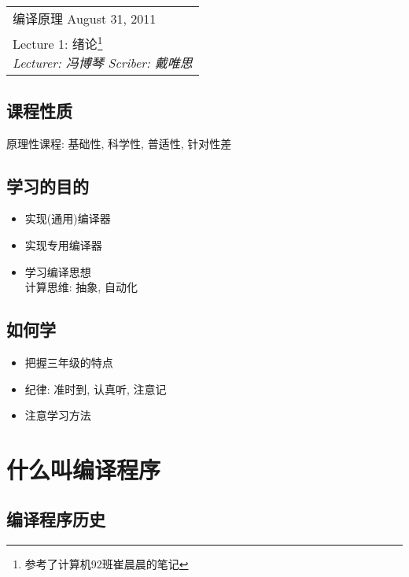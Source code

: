 \clearpage \noindent\begin{tabularx}{\linewidth}{|X|}
\hline \vskip -2mm
{\sf 编译原理} \hfill August 31, 2011 \\
{\centering \sf \large Lecture 1:
绪论\footnote{参考了计算机92班崔晨晨的笔记} \\ }
\textsl{Lecturer: 冯博琴 \hfill Scriber: 戴唯思}\\ \hline
\end{tabularx}
\setcounter{section}{0}
\renewcommand{\thepage}{\lecture -\arabic{page}}
\def\lecture{1}

\subsection{课程性质}

    原理性课程: 基础性, 科学性, 普适性, 针对性差

\subsection{学习的目的}

    \begin{itemize}
        \item 实现(通用)编译器
        \item 实现专用编译器
        \item 学习编译思想 \\
            计算思维: 抽象, 自动化
    \end{itemize}

\subsection{如何学}

    \begin{itemize}
        \item 把握三年级的特点
        \item 纪律: 准时到, 认真听, 注意记
        \item 注意学习方法
    \end{itemize}

\section{什么叫编译程序}

    \subsection{编译程序历史}

